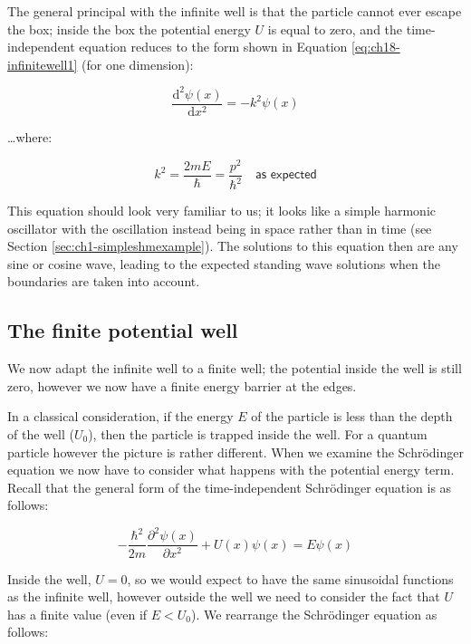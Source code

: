 \documentclass[
]{book}
\begin{document}
The general principal with the infinite well is that the particle cannot ever escape the box; inside the box the potential energy \(U\) is equal to zero, and the time-independent equation reduces to the form shown in Equation \eqref{eq:ch18-infinitewell1} (for one dimension):

\begin{equation}
\frac{\mathrm{d}^2 \psi(x)}{\mathrm{d}x^2} = -k^2 \psi(x)
\label{eq:ch18-infinitewell1}
\end{equation}

\ldots where:

\begin{equation}
k^2 = \frac{2mE}{\hbar} = \frac{p^2}{\hbar^2} \quad \textsf{as expected}
\end{equation}

This equation should look very familiar to us; it looks like a simple harmonic oscillator with the oscillation instead being in space rather than in time (see Section \ref{sec:ch1-simpleshmexample}). The solutions to this equation then are any sine or cosine wave, leading to the expected standing wave solutions when the boundaries are taken into account.

\hypertarget{the-finite-potential-well}{%
\subsection{The finite potential well}\label{the-finite-potential-well}}

We now adapt the infinite well to a finite well; the potential inside the well is still zero, however we now have a finite energy barrier at the edges.

In a classical consideration, if the energy \(E\) of the particle is less than the depth of the well (\(U_0\)), then the particle is trapped inside the well. For a quantum particle however the picture is rather different. When we examine the Schrödinger equation we now have to consider what happens with the potential energy term. Recall that the general form of the time-independent Schrödinger equation is as follows:

\begin{equation}
-\frac{\hbar^2}{2m} \frac{\partial^2 \psi(x)}{\partial x^2} + U(x) \psi(x) =  E \psi(x)
\end{equation}

Inside the well, \(U = 0\), so we would expect to have the same sinusoidal functions as the infinite well, however outside the well we need to consider the fact that \(U\) has a finite value (even if \(E<U_0\)). We rearrange the Schrödinger equation as follows:
\end{document}
